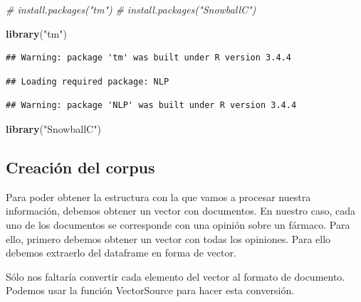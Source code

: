 \documentclass[spanish,]{article}
\newenvironment{Shaded}{\begin{snugshade}}{\end{snugshade}}
\newcommand{\KeywordTok}[1]{\textcolor[rgb]{0.13,0.29,0.53}{\textbf{#1}}}
\newcommand{\StringTok}[1]{\textcolor[rgb]{0.31,0.60,0.02}{#1}}
\newcommand{\CommentTok}[1]{\textcolor[rgb]{0.56,0.35,0.01}{\textit{#1}}}
\newcommand{\OperatorTok}[1]{\textcolor[rgb]{0.81,0.36,0.00}{\textbf{#1}}}
\newcommand{\NormalTok}[1]{#1}
\begin{document}
\begin{Shaded}
\begin{Highlighting}[]
\CommentTok{# install.packages("tm")}
\CommentTok{# install.packages("SnowballC")}

\KeywordTok{library}\NormalTok{(}\StringTok{"tm"}\NormalTok{)}
\end{Highlighting}
\end{Shaded}

\begin{verbatim}
## Warning: package 'tm' was built under R version 3.4.4
\end{verbatim}

\begin{verbatim}
## Loading required package: NLP
\end{verbatim}

\begin{verbatim}
## Warning: package 'NLP' was built under R version 3.4.4
\end{verbatim}

\begin{Shaded}
\begin{Highlighting}[]
\KeywordTok{library}\NormalTok{(}\StringTok{"SnowballC"}\NormalTok{)}
\end{Highlighting}
\end{Shaded}

\subsection{Creación del corpus}\label{creacion-del-corpus}

Para poder obtener la estructura con la que vamos a procesar nuestra
información, debemos obtener un vector con documentos. En nuestro caso,
cada uno de los documentos se corresponde con una opinión sobre un
fármaco. Para ello, primero debemos obtener un vector con todas los
opiniones. Para ello debemos extraerlo del dataframe en forma de vector.

Sólo nos faltaría convertir cada elemento del vector al formato de
documento. Podemos usar la función VectorSource para hacer esta
conversión.

\begin{Shaded}
\end{Shaded}
\end{document}
